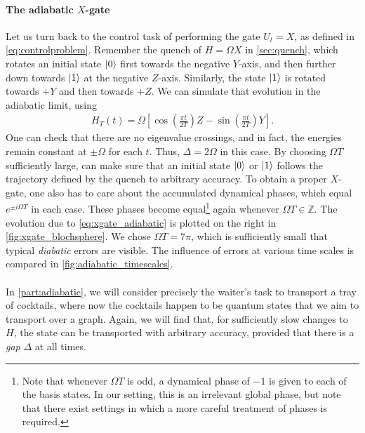 \paragraph{The adiabatic $X$-gate}
Let us turn back to the control task of performing the gate $U_t = X$, as defined in \cref{eq:controlproblem}. Remember the quench of $H=\Omega X$ in \cref{sec:quench}, which rotates an initial state $\lvert0\rangle$ first towards the negative $Y$-axis, and then further down towards $\lvert1\rangle$ at the negative $Z$-axis. Similarly, the state $\lvert1\rangle$ is rotated towards $+Y$ and then towards $+Z$. We can simulate that evolution in the adiabatic limit, using 
\begin{align}
H_T(t) = \Omega \left[ \cos \left( \frac{\pi t}{2 T}  \right) Z - \sin \left( \frac{\pi t}{2 T}  \right) Y \right].
\label{eq:xgate_adiabatic}
\end{align}
One can check that there are no eigenvalue crossings, and in fact, the energies remain constant at $\pm \Omega$ for each $t$. Thus, $\Delta = 2 \Omega$ in this case. By choosing $\Omega T$ sufficiently large, can make sure that an initial state $\lvert0\rangle$ or $\lvert1\rangle$ follows the trajectory defined by the quench to arbitrary accuracy. To obtain a proper $X$-gate, one also has to care about the accumulated dynamical phases, which equal $e^{\pm i \Omega T}$ in each case. These phases become equal\footnote{Note that whenever $\Omega T$ is odd, a dynamical phase of $-1$ is given to each of the basis states. In our setting, this is an irrelevant global phase, but note that there exist settings in which a more careful treatment of phases is required.}
 again whenever $\Omega T \in \mathbb{Z}$. The evolution due to \cref{eq:xgate_adiabatic} is plotted on the right in \cref{fig:xgate_blochsphere}. We chose $\Omega T = 7 \pi$, which is sufficiently small that typical \emph{diabatic} errors are visible. The influence of errors at various time scales is compared in \cref{fig:adiabatic_timescales}.



%



\paragraph{}
In \cref{part:adiabatic}, we will consider precisely the waiter's task to transport a tray of cocktails, where now the cocktails happen to be quantum states that we aim to transport over a graph. Again, we will find that, for sufficiently slow changes to $H$, the state can be transported with arbitrary accuracy, provided that there is a \emph{gap} $\Delta$ at all times. 





